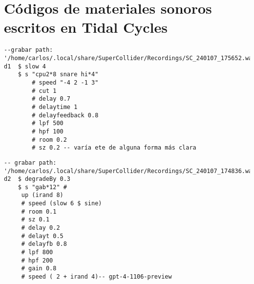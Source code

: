 \section*{Códigos de materiales sonoros escritos en Tidal Cycles}



\begin{minipage}[t]{1\textwidth}
    \centering
    \begin{lstlisting}[style=SuperCollider-IDE, language=ExtendedHaskell, basicstyle=\footnotesize\ttfamily, numbers=none]
--grabar path: '/home/carlos/.local/share/SuperCollider/Recordings/SC_240107_175652.wav'
d1  $ slow 4 
    $ s "cpu2*8 snare hi*4" 
        # speed "-4 2 -1 3" 
        # cut 1 
        # delay 0.7 
        # delaytime 1 
        # delayfeedback 0.8 
        # lpf 500 
        # hpf 100 
        # room 0.2 
        # sz 0.2 -- varía ete de alguna forma más clara                                        
    \end{lstlisting}
    \vspace{1cm}
\end{minipage}





\begin{minipage}[t]{1\textwidth}
    \centering
    \begin{lstlisting}[style=SuperCollider-IDE, language=ExtendedHaskell, basicstyle=\footnotesize\ttfamily, numbers=none]
-- grabar path: '/home/carlos/.local/share/SuperCollider/Recordings/SC_240107_174836.wav'
d2  $ degradeBy 0.3 
    $ s "gab*12" #
     up (irand 8) 
     # speed (slow 6 $ sine) 
     # room 0.1 
     # sz 0.1 
     # delay 0.2 
     # delayt 0.5 
     # delayfb 0.8 
     # lpf 800 
     # hpf 200 
     # gain 0.8 
     # speed ( 2 + irand 4)-- gpt-4-1106-preview                                   
    \end{lstlisting}
    \vspace{1cm}
\end{minipage}








